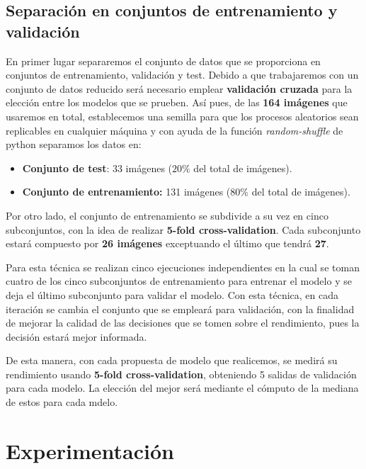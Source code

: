     \subsection{Separación en conjuntos de entrenamiento y validación}
        \noindent En primer lugar separaremos el conjunto de datos que se proporciona en conjuntos de entrenamiento, validación y test. Debido a que trabajaremos con un conjunto de datos reducido será necesario emplear \textbf{validación cruzada} para la elección entre los modelos que se prueben. Así pues, de las \textbf{164 imágenes} que usaremos en total, establecemos una semilla para que los procesos aleatorios sean replicables en cualquier máquina y con ayuda de la función \textit{random-shuffle} de python separamos los datos en: 

        \begin{itemize}
            \item \textbf{Conjunto de test}: 33 imágenes ($20\%$ del total de imágenes).
            \item \textbf{Conjunto de entrenamiento:} 131 imágenes ($80\%$ del total de imágenes).
        \end{itemize}

        \noindent Por otro lado, el conjunto de entrenamiento se subdivide a su vez en cinco subconjuntos, con la idea de realizar \textbf{5-fold cross-validation}. Cada subconjunto estará compuesto por \textbf{26 imágenes} exceptuando el último que tendrá \textbf{27}.
        
        \medskip

        \noindent Para esta técnica se realizan cinco ejecuciones independientes en la cual se toman cuatro de los cinco subconjuntos de entrenamiento para entrenar el modelo y se deja el último subconjunto para validar el modelo. Con esta técnica, en cada iteración se cambia el conjunto que se empleará para validación, con la finalidad de mejorar la calidad de las decisiones que se tomen sobre el rendimiento, pues la decisión estará mejor informada. 

        \medskip

        \noindent De esta manera, con cada propuesta de modelo que realicemos, se medirá su rendimiento usando \textbf{5-fold cross-validation}, obteniendo 5 salidas de validación para cada modelo. La elección del mejor será mediante el cómputo de la mediana de estos para cada mdelo.


\section{Experimentación}
